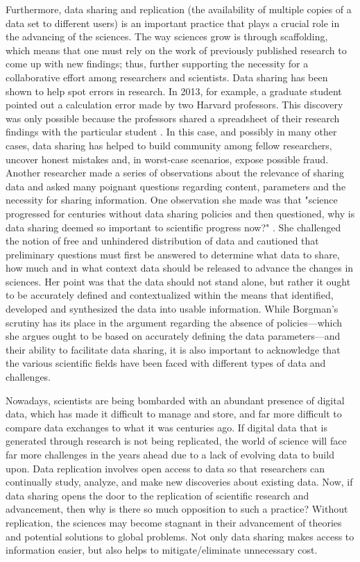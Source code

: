 \documentclass[sigconf]{acmart}
\begin{document}
Furthermore, data sharing and replication (the availability of multiple copies of a data set to different users) is an important practice that plays a crucial role in the advancing of the sciences. The way sciences grow is through scaffolding, which means that one must rely on the work of previously published research to come up with new findings; thus, further supporting the necessity for a collaborative effort among researchers and scientists. Data sharing has been shown to help spot errors in research. In 2013, for example, a graduate student pointed out a calculation error made by two Harvard professors. This discovery was only possible because the professors shared a spreadsheet of their research findings with the particular student \cite{leetaru2016}. In this case, and possibly in many other cases, data sharing has helped to build community among fellow researchers, uncover honest mistakes and, in worst-case scenarios, expose possible fraud. Another researcher made a series of observations about the relevance of sharing data and asked many poignant questions regarding content, parameters and the necessity for sharing information. One observation she made was that "science progressed for centuries without data sharing policies and then questioned, why is data sharing deemed so important to scientific progress now?" \cite{borgman2015if}. She challenged the notion of free and unhindered distribution of data and cautioned that preliminary questions must first be answered to determine what data to share, how much and in what context data should be released to advance the changes in sciences. Her point was that the data should not stand alone, but rather it ought to be accurately defined and contextualized within the means that identified, developed and synthesized the data into usable information. While Borgman's scrutiny has its place in the argument regarding the absence of policies—which she argues ought to be based on accurately defining the data parameters—and their ability to facilitate data sharing, it is also important to acknowledge that the various scientific fields have been faced with different types of data and challenges. 

Nowadays, scientists are being bombarded with an abundant presence of digital data, which has made it difficult to manage and store, and far more difficult to compare data exchanges to what it was centuries ago. If digital data that is generated through research is not being replicated, the world of science will face far more challenges in the years ahead due to a lack of evolving data to build upon. Data replication involves open access to data so that researchers can continually study, analyze, and make new discoveries about existing data. Now, if data sharing opens the door to the replication of scientific research and advancement, then why is there so much opposition to such a practice? Without replication, the sciences may become stagnant in their advancement of theories and potential solutions to global problems. Not only data sharing makes access to information easier, but also helps to mitigate/eliminate unnecessary cost. 
\end{document}
